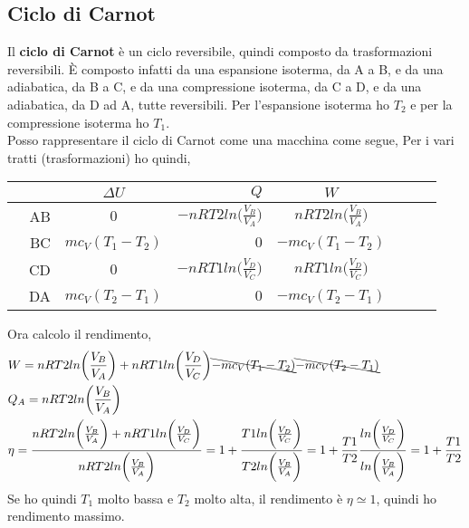         \subsection{Ciclo di Carnot}
            Il \textbf{ciclo di Carnot} è un ciclo reversibile, quindi composto da trasformazioni reversibili. È composto infatti da una espansione isoterma, da A a B, e da una adiabatica, da B a C, e da una compressione isoterma, da C a D, e da una adiabatica, da D ad A, tutte reversibili. Per l'espansione isoterma ho $T_2$ e per la compressione isoterma ho $T_1$.\\
            Posso rappresentare il ciclo di Carnot come una macchina come segue,
            Per i vari tratti (trasformazioni) ho quindi,
            \begin{center}
                \begin{tabular}{|cr|cr|cr|cr|}
                    \hline
                    & \quad & $\Delta U$ & $Q$ & $W$\tabularnewline
                    \hline
                    & AB & $0$ & $-nRT2ln\bigg(\frac{V_B}{V_A}\bigg)$ & $nRT2ln\bigg(\frac{V_B}{V_A}\bigg)$\tabularnewline
                    \hline
                    & BC & $mc_V(T_1 - T_2)$ & $0$ & $-mc_V(T_1 - T_2)$\tabularnewline
                    \hline
                    & CD & $0$ & $-nRT1ln\bigg(\frac{V_D}{V_C}\bigg)$ & $nRT1ln\bigg(\frac{V_D}{V_C}\bigg)$\tabularnewline
                    \hline
                    & DA & $mc_V(T_2 - T_1)$ & $0$ & $-mc_V(T_2 - T_1)$\tabularnewline
                    \hline
                \end{tabular}
            \end{center}
            Ora calcolo il rendimento,
            \begin{align*}
                &W = nRT2ln\bigg(\frac{V_B}{V_A}\bigg) + nRT1ln\bigg(\frac{V_D}{V_C}\bigg) \bcancel{- mc_V(T_1 - T_2)} \bcancel{- mc_V(T_2 - T_1)}\\
                &Q_A = nRT2ln\bigg(\frac{V_B}{V_A}\bigg)\\
                &\eta = \frac{nRT2ln\bigg(\frac{V_B}{V_A}\bigg) + nRT1ln\bigg(\frac{V_D}{V_C}\bigg)}{nRT2ln\bigg(\frac{V_B}{V_A}\bigg)}=1 + \frac{ T1ln\bigg(\frac{V_D}{V_C}\bigg)}{T2ln\bigg(\frac{V_B}{V_A}\bigg)} = 1 + \frac{T1}{T2}\frac{ln\bigg(\frac{V_D}{V_C}\bigg)}{ln\bigg(\frac{V_B}{V_A}\bigg)} = 1 + \frac{T1}{T2}
            \end{align*}
            Se ho quindi $T_1$ molto bassa e $T_2$ molto alta, il rendimento è $\eta\simeq 1$, quindi ho rendimento massimo.

